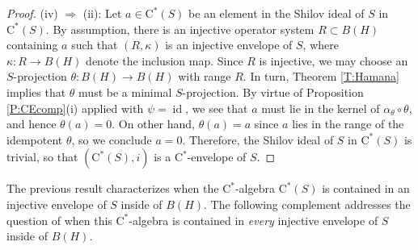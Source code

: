 \documentclass[10pt]{amsart}
\newcommand{\rC}{\mathrm{C}}
\newcommand{\id}{\operatorname{id}}
\theoremstyle{definition}
\begin{document}
\begin{proof}
(iv) $\Rightarrow$ (ii): Let $a\in \rC^*(S)$ be an element in the Shilov ideal of $S$ in $\rC^*(S)$. By assumption, there is an injective operator system $R\subset B(H)$  containing $a$ such that $(R,\kappa)$ is an injective envelope of $S$, where $\kappa:R\to B(H)$ denote the inclusion map. Since $R$ is injective, we may choose an $S$-projection $\theta:B(H)\to B(H)$ with range $R$. In turn, Theorem \ref{T:Hamana} implies that $\theta$ must be a minimal $S$-projection.  By virtue of Proposition \ref{P:CEcomp}(i) applied with $\psi=\id$, we see that $a$ must lie in the kernel of $\alpha_\theta\circ \theta$, and hence $\theta(a)=0$. On other hand, $\theta(a)=a$ since $a$ lies in the range of the idempotent $\theta$, so we conclude $a=0$. Therefore, the Shilov ideal of $S$ in $\rC^*(S)$ is trivial, so that $(\rC^*(S),i)$ is a  $\rC^*$-envelope of $S$.
\end{proof}

The previous result characterizes when the $\rC^*$-algebra $\rC^*(S)$ is contained in an injective envelope of $S$ inside of $B(H)$. The following complement addresses the question of when this $\rC^*$-algebra is contained in \emph{every} injective envelope of $S$ inside of $B(H)$. 
\end{document}
